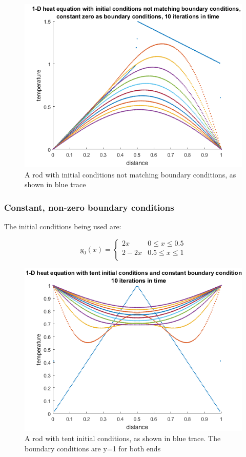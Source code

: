 \documentclass[a4paper, 12pt]{article}
\begin{document}
\begin{figure}[h]
\centering
\includegraphics[width=\textwidth]{exbonus/tent1.png}
\caption{A rod with initial conditions not matching boundary conditions, as shown in blue trace}
\end{figure}
\newpage



\newpage
\subsubsection{Constant, non-zero boundary conditions}
The initial conditions being used are:

\[ y_0(\textit{x})=
	\begin{cases} 
      2x & 0\leq x\leq 0.5 \\
      2-2x & 0.5\leq x\leq 1 \\
   \end{cases}\]


\begin{figure}[h]
\centering
\includegraphics[width=\textwidth]{exbonus/constbound.png}
\caption{A rod with tent initial conditions, as shown in blue trace. The boundary conditions are y=1 for both ends}
\end{figure}

\end{document}
